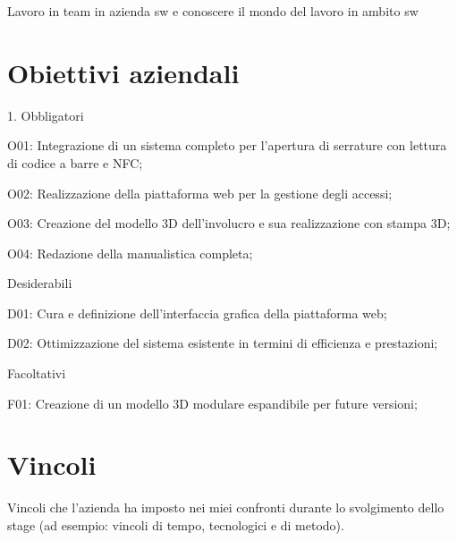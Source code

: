 Lavoro in team in azienda sw e conoscere il mondo del lavoro in ambito sw

\section{Obiettivi aziendali}
1.	Obbligatori

O01: Integrazione di un sistema completo per l'apertura di serrature con lettura di codice a barre e NFC; 

O02: Realizzazione della piattaforma web per la gestione degli accessi; 

O03: Creazione del modello 3D dell'involucro e sua realizzazione con stampa 3D; 

O04: Redazione della manualistica completa; 

Desiderabili

D01: Cura e definizione dell'interfaccia grafica della piattaforma web;

D02: Ottimizzazione del sistema esistente in termini di efficienza e prestazioni; 


Facoltativi 

F01: Creazione di un modello 3D modulare espandibile per future versioni; 


\section{Vincoli}
Vincoli che l'azienda ha imposto nei miei confronti durante lo svolgimento dello stage (ad esempio: vincoli di tempo, tecnologici e di metodo).